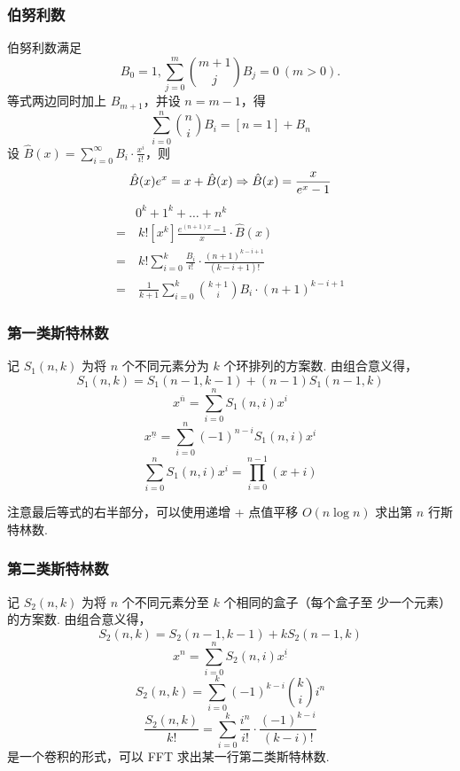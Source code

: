 \subsubsection{伯努利数}
\noindent 伯努利数满足
\begin{equation*}
    B_0 = 1, \sum_{j=0}^m \binom{m+1}{j} B_j = 0 ~ (m > 0).
\end{equation*}
\noindent 等式两边同时加上 $B_{m+1}$，并设 $n = m - 1$，得
\begin{equation*}
\sum_{i=0}^n \binom{n}{i} B_i = [n = 1] + B_n
\end{equation*}
\noindent 设 $\hat{B}(x) = \sum_{i=0}^\infty B_i \cdot \frac{x^i}{i!}$，则
\begin{equation*}
\hat{B}(x) e^x = x + \hat{B}(x) \Rightarrow \hat{B}(x) = \frac{x}{e^x - 1} \\
\end{equation*}
\begin{equation*}
\begin{aligned}
& 0^k + 1^k + \ldots + n^k \\
=& ~ k! \left[ x^k \right] \frac{e^{(n+1)x}-1}{x} \cdot \hat{B}(x) \\
=& ~ k! \sum_{i=0}^k \frac{B_i}{i!} \cdot \frac{(n+1)^{k-i+1}}{(k-i+1)!} \\
=& ~ \frac{1}{k+1} \sum_{i=0}^k \binom{k+1}{i} B_i \cdot (n+1)^{k-i+1}
\end{aligned}
\end{equation*}

\subsubsection{第一类斯特林数}
\noindent 记 $S_1(n, k)$ 为将 $n$ 个不同元素分为 $k$ 个环排列的方案数. 由组合意义得，
$$
S_1(n, k) = S_1(n - 1, k - 1) + (n - 1) S_1(n - 1, k)
$$
$$
x^{\overline{n}} = \sum_{i=0}^n S_1(n, i) x^i
$$
$$
x^{\underline{n}} = \sum_{i=0}^n (-1)^{n-i} S_1(n, i) x^i
$$
$$
\sum_{i=0}^n S_1(n, i) x^i = \prod_{i=0}^{n-1} (x+i)
$$

\noindent 注意最后等式的右半部分，可以使用递增 + 点值平移 $O(n \log n)$ 求出第
$n$ 行斯特林数.

\subsubsection{第二类斯特林数}
\noindent 记 $S_2(n, k)$ 为将 $n$ 个不同元素分至 $k$ 个相同的盒子（每个盒子至
少一个元素）的方案数. 由组合意义得，
$$
S_2(n, k) = S_2(n - 1, k - 1) + k S_2(n - 1, k)
$$
$$
x^n = \sum_{i=0}^n S_2(n, i) x^{\underline{i}}
$$
$$
S_2(n, k) = \sum_{i=0}^k (-1)^{k-i} \binom{k}{i} i^n
$$
$$
\frac{S_2(n, k)}{k!} = \sum_{i=0}^k \frac{i^n}{i!} \cdot \frac{(-1)^{k-i}}
{(k-i)!}
$$
\noindent 是一个卷积的形式，可以 FFT 求出某一行第二类斯特林数.

